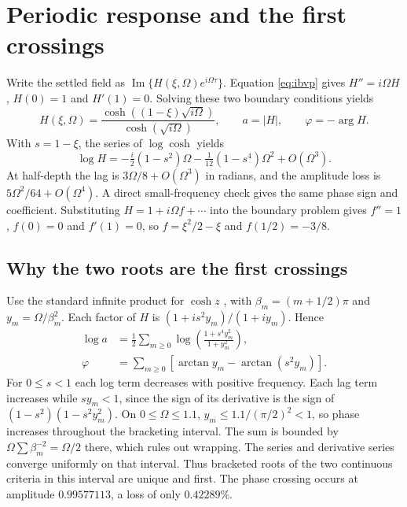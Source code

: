 \documentclass[11pt,a4paper]{article}
\newcommand{\phase}{\varphi}
\begin{document}
\section{Periodic response and the first crossings}
Write the settled field as $\operatorname{Im}\{H(\xi,\Omega)e^{i\Omega\tau}\}$. Equation \eqref{eq:ibvp} gives $H''=i\Omega H$, $H(0)=1$ and $H'(1)=0$. Solving these two boundary conditions yields
\begin{equation}\label{eq:transfer}
H(\xi,\Omega)=\frac{\cosh((1-\xi)\sqrt{i\Omega})}{\cosh(\sqrt{i\Omega})},\qquad
a=|H|,\qquad \phase=-\arg H.
\end{equation}
With $s=1-\xi$, the series of $\log\cosh$ yields
\begin{equation}
\log H=-\tfrac{i}{2}(1-s^2)\Omega-\tfrac{1}{12}(1-s^4)\Omega^2+O(\Omega^3).
\end{equation}
At half-depth the lag is $3\Omega/8+O(\Omega^3)$ in radians, and the amplitude loss is $5\Omega^2/64+O(\Omega^4)$. A direct small-frequency check gives the same phase sign and coefficient. Substituting $H=1+i\Omega f+\cdots$ into the boundary problem gives $f''=1$, $f(0)=0$ and $f'(1)=0$, so $f=\xi^2/2-\xi$ and $f(1/2)=-3/8$.

\subsection{Why the two roots are the first crossings}
Use the standard infinite product for $\cosh z$ \cite{dlmf}, with $\beta_m=(m+1/2)\pi$ and $y_m=\Omega/\beta_m^2$. Each factor of $H$ is $(1+i s^2y_m)/(1+i y_m)$. Hence
\begin{align}
\log a&=\tfrac12\sum_{m\geq0}\log\!\left(\frac{1+s^4y_m^2}{1+y_m^2}\right),\\
\phase&=\sum_{m\geq0}\left[\arctan y_m-\arctan(s^2y_m)\right].
\end{align}
For $0\leq s<1$ each log term decreases with positive frequency. Each lag term increases while $s y_m<1$, since the sign of its derivative is the sign of $(1-s^2)(1-s^2y_m^2)$. On $0\leq\Omega\leq1.1$, $y_m\leq 1.1/(\pi/2)^2<1$, so phase increases throughout the bracketing interval. The sum is bounded by $\Omega\sum\beta_m^{-2}=\Omega/2$ there, which rules out wrapping. The series and derivative series converge uniformly on that interval. Thus bracketed roots of the two continuous criteria in this interval are unique and first. The phase crossing occurs at amplitude $0.99577113$, a loss of only $0.42289\%$.
\end{document}
